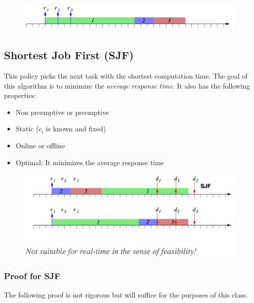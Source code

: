 \documentclass{hw}
\begin{document}
\begin{figure}[H]
  \centering
  \includegraphics[scale=.6]{img/fcfs2}
\end{figure}

\subsection{Shortest Job First (SJF)}
This policy picks the next task with the shortest computation time. The goal of 
this algorithm is to minimize the \emph{average response time}. It also has the
following properties:
\begin{itemize}
  \item Non preemptive or preemptive
  \item Static ($c_{i}$ is known and fixed)
  \item Online or offline
  \item Optimal: It minimizes the average response time
\end{itemize}

\begin{figure}[H]
  \centering
  \includegraphics[scale=.6]{img/sjf}
\end{figure}

\subsubsection{Proof for SJF}
The following proof is not rigorous but will suffice for the purposes of this
class. \\
\end{document}
